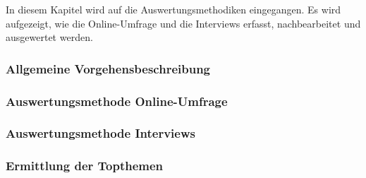 \documentclass[../../main.tex]{subfiles}
\begin{document}
\begin{sloppypar}
In diesem Kapitel wird auf die Auswertungsmethodiken eingegangen. Es wird aufgezeigt, wie die Online-Umfrage und die Interviews erfasst, nachbearbeitet und ausgewertet werden.

\end{sloppypar}

\subsubsection{Allgemeine Vorgehensbeschreibung}
\label{allgemeine_vorgehensbeschreibung}



\subsubsection{Auswertungsmethode Online-Umfrage}
\label{auswertung_online}



\newpage
\subsubsection{Auswertungsmethode Interviews}
\label{auswertung_interview}



\subsubsection{Ermittlung der Topthemen}
\label{ermittlung_topthemen}

\end{document}
